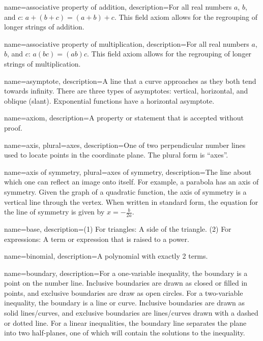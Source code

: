  {
	name=associative property of addition,
	description={For all real numbers $a$, $b$, and $c$: $a + (b + c) = (a + b) + c$. This field axiom allows for the regrouping of longer strings of addition.}
}

 {
	name=associative property of multiplication,
	description={For all real numbers $a$, $b$, and $c$: $a (b c) = (a b) c$. This field axiom allows for the regrouping of longer strings of multiplication.}
}

 {
	name=asymptote,
	description={A line that a curve approaches as they both tend towards infinity. There are three types of asymptotes: vertical, horizontal, and oblique (slant). Exponential functions have a horizontal asymptote.}
}

 {
	name=axiom,
	description={A property or statement that is accepted without proof.}
}

 {
	name=axis,
	plural=axes,
	description={One of two perpendicular number lines used to locate points in the coordinate plane. The plural form is ``axes''.}
}

 {
	name=axis of symmetry,
	plural=axes of symmetry,
	description={The line about which one can reflect an image onto itself. For example, a parabola has an axis of symmetry. Given the graph of a quadratic function, the axis of symmetry is a vertical line through the vertex. When written in standard form, the equation for the line of symmetry is given by $x = -\frac{b}{2a}$.}
}

 {
	name=base,
	description={(1) For triangles: A side of the triangle. (2) For expressions: A term or expression that is raised to a power.}
}

 {
	name=binomial,
	description={A polynomial with exactly 2 terms.}
}

 {
	name=boundary,
	description={For a one-variable \gls{inequality}, the boundary is a point on the number line. Inclusive boundaries are drawn as closed or filled in points, and exclusive boundaries are draw as open circles. For a two-variable inequality, the boundary is a line or curve. Inclusive boundaries are drawn as solid 
lines/curves, and exclusive boundaries are lines/curves drawn with a dashed or dotted line. For a linear inequalities, the boundary line separates the plane into two \glspl{half-plane}, one of which will contain the solutions to the inequality.}
}


